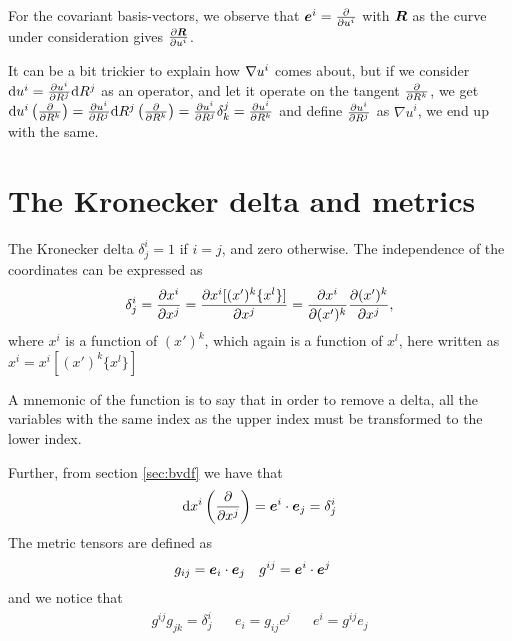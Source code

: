 \documentclass[a4paper, 12pt]{article}
\begin{document}
For the covariant basis-vectors, we observe that $\boldsymbol{e}^i = \frac{\partial {}}{\partial{u^i}}$ 
with $\boldsymbol{R}$ as the curve under consideration gives $\frac{\partial {\boldsymbol{R}}}{\partial{u^i}}$.

It can be a bit trickier to explain how $\nabla u^i$ comes about, but if we 
consider $\text{d} u^i = \frac{\partial {u^i}}{\partial{R^j}} \text{d} R^j$ as an operator, and let it operate 
on the tangent $\frac{\partial {}}{\partial{R^k}}$, we get $\text{d} u^i\left(\frac{\partial {}}{\partial{R^k}}\right) = 
\frac{\partial {u^i}}{\partial{R^j}} \text{d} R^j\left(\frac{\partial {}}{\partial{R^k}}\right) = \frac{\partial {u^i}}{\partial{R^j}} \delta^j_k = 
\frac{\partial {u^i}}{\partial{R^k}}$ and define $\frac{\partial {u^i}}{\partial{R^j}}$ as $\nabla u^i$, we end up with 
the same.





\section{The Kronecker delta and metrics}
The Kronecker delta $\delta^i_j = 1$ if $i=j$, and zero otherwise. The 
independence of the coordinates can be expressed as
%
\begin{align*}
 \delta^i_j = \frac{\partial {x^i}}{\partial{x^j}} = \frac{\partial {x^i[(x')^k\{x^l\}]}}{\partial{x^j}} = 
 \frac{\partial {x^i}}{\partial{(x')^k}}\frac{\partial {(x')^k}}{\partial{x^j}},
\end{align*}
%
where $x^i$ is a function of $(x')^k$, which again is a function of $x^l$, here 
written as $x^i = x^i[(x')^k\{x^l\}]$

A mnemonic of the function is to say that in order to remove a delta, all the 
variables with the same index as the upper index must be transformed to the 
lower index.

Further, from section \ref{sec:bvdf} we have that
%
\begin{align*}
 \text{d} x^i \left(\frac{\partial {}}{\partial{x^j}}\right) = \boldsymbol{e}^i\cdot\boldsymbol{e}_j = \delta^i_j
\end{align*}
%
The metric tensors are defined as
%
\begin{align*}
 &g_{ij} = \boldsymbol{e}_i\cdot\boldsymbol{e}_j&
 &g^{ij} = \boldsymbol{e}^i\cdot\boldsymbol{e}^j
\end{align*}
%
and we notice that
%
\begin{align*}
 &g^{ij} g_{jk} = \delta^i_j&
 &e_i = g_{ij}e^j &
 &e^i = g^{ij}e_j&
\end{align*}
\end{document}
